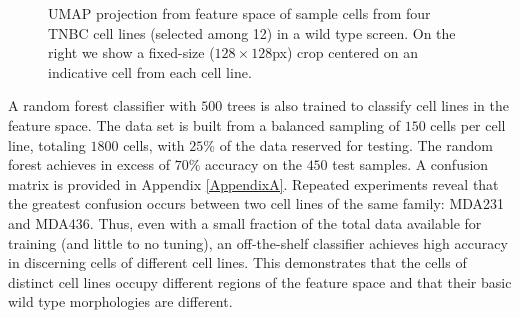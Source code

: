 \begin{figure}[ht]
\caption{UMAP projection from feature space of sample cells from four TNBC cell lines (selected among 12) in a wild type screen. On the right we show a fixed-size ($128\times128$px) crop centered on an indicative cell from each cell line.}
\label{fig:umap_cell_lines}
\end{figure}

A random forest classifier with $500$ trees is also trained to classify cell lines in the feature space. The data set is built from a balanced sampling of $150$ cells per cell line, totaling $1800$ cells, with $25\%$ of the data reserved for testing. The random forest achieves in excess of $70\%$ accuracy on the $450$ test samples. A confusion matrix is provided in Appendix \ref{AppendixA}. Repeated experiments reveal that the greatest confusion occurs between two cell lines of the same family: MDA231 and MDA436. Thus, even with a small fraction of the total data available for training (and little to no tuning), an off-the-shelf classifier achieves high accuracy in discerning cells of different cell lines. This demonstrates that the cells of distinct cell lines occupy different regions of the feature space and that their basic wild type morphologies are different.

